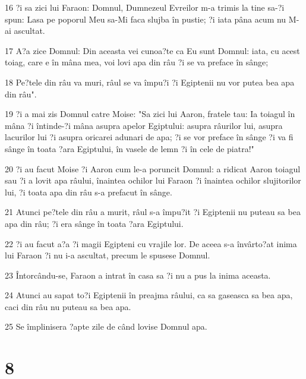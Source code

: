 \par 16 ?i sa zici lui Faraon: Domnul, Dumnezeul Evreilor m-a trimis la tine sa-?i spun: Lasa pe poporul Meu sa-Mi faca slujba în pustie; ?i iata pâna acum nu M-ai ascultat.
\par 17 A?a zice Domnul: Din aceasta vei cunoa?te ca Eu sunt Domnul: iata, cu acest toiag, care e în mâna mea, voi lovi apa din râu ?i se va preface în sânge;
\par 18 Pe?tele din râu va muri, râul se va împu?i ?i Egiptenii nu vor putea bea apa din râu".
\par 19 ?i a mai zis Domnul catre Moise: "Sa zici lui Aaron, fratele tau: Ia toiagul în mâna ?i întinde-?i mâna asupra apelor Egiptului: asupra râurilor lui, asupra lacurilor lui ?i asupra oricarei adunari de apa; ?i se vor preface în sânge ?i va fi sânge în toata ?ara Egiptului, în vasele de lemn ?i în cele de piatra!"
\par 20 ?i au facut Moise ?i Aaron cum le-a poruncit Domnul: a ridicat Aaron toiagul sau ?i a lovit apa râului, înaintea ochilor lui Faraon ?i înaintea ochilor slujitorilor lui, ?i toata apa din râu s-a prefacut în sânge.
\par 21 Atunci pe?tele din râu a murit, râul s-a împu?it ?i Egiptenii nu puteau sa bea apa din râu; ?i era sânge în toata ?ara Egiptului.
\par 22 ?i au facut a?a ?i magii Egipteni cu vrajile lor. De aceea s-a învârto?at inima lui Faraon ?i nu i-a ascultat, precum le spusese Domnul.
\par 23 Întorcându-se, Faraon a intrat în casa sa ?i nu a pus la inima aceasta.
\par 24 Atunci au sapat to?i Egiptenii în preajma râului, ca sa gaseasca sa bea apa, caci din râu nu puteau sa bea apa.
\par 25 Se împlinisera ?apte zile de când lovise Domnul apa.

\chapter{8}

